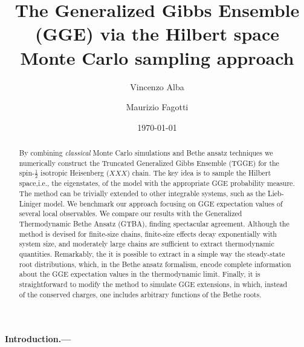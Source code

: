 \documentclass[twocolumn,superscriptaddress,prb,10pt]{revtex4-1}
\begin{document}
\title{The Generalized Gibbs Ensemble (GGE) via the Hilbert space 
Monte Carlo sampling approach} 

\author{Vincenzo Alba}

\author{Maurizio Fagotti}

\date{\today}




\begin{abstract} 

By combining {\it classical} Monte Carlo simulations and Bethe ansatz techniques we numerically 
construct the Truncated Generalized Gibbs Ensemble (TGGE) for the spin-$\frac{1}{2}$ isotropic Heisenberg ($XXX$) chain. The key 
idea is to sample the Hilbert space,i.e., the eigenstates, of the model with the appropriate 
GGE probability measure. The method can be trivially extended to other 
integrable systems, such as the Lieb-Liniger model. We benchmark our approach focusing on GGE expectation 
values of  several local observables. We compare our results with the Generalized Thermodynamic 
Bethe Ansatz (GTBA), finding spectacular agreement. Although the method is devised for finite-size chains, 
finite-size effects decay exponentially with system size, and moderately large chains are sufficient to 
extract thermodynamic quantities. 
Remarkably, the it is possible to extract in a simple way the steady-state root distributions, which, 
in the Bethe ansatz formalism, encode complete information about the GGE expectation values in the 
thermodynamic limit. Finally, it is straightforward to modify the method to simulate GGE extensions, in which,  
instead of the conserved charges, one includes arbitrary functions of the Bethe roots. 

\end{abstract}


\maketitle


\paragraph*{Introduction.---}
\end{document}
